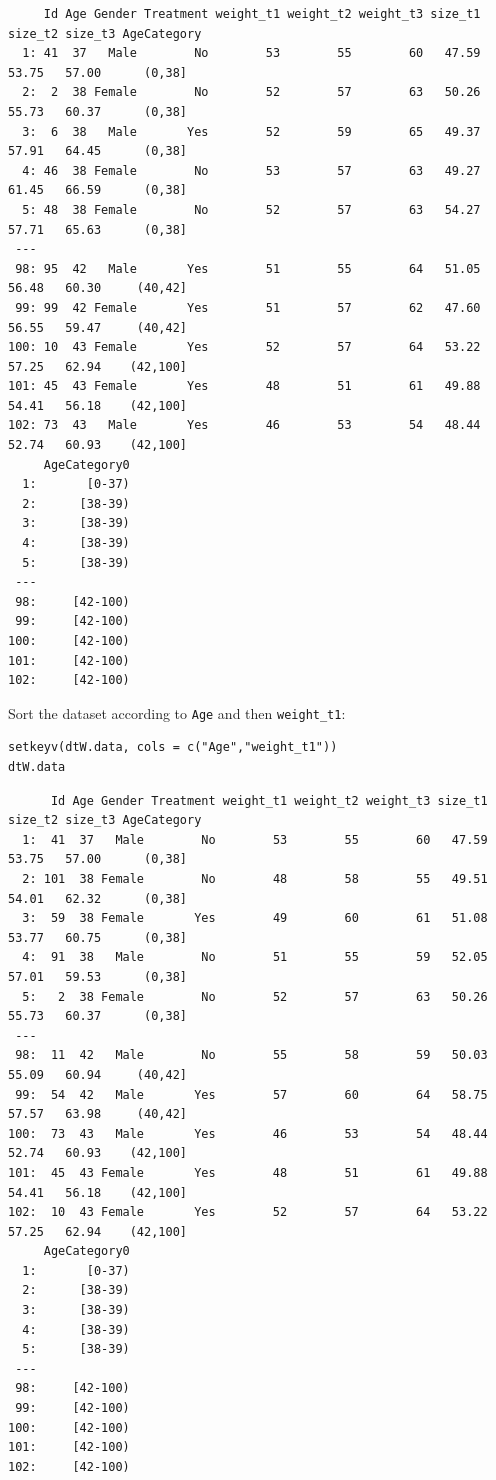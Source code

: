\documentclass{article}
\begin{document}
\begin{verbatim}
     Id Age Gender Treatment weight_t1 weight_t2 weight_t3 size_t1 size_t2 size_t3 AgeCategory
  1: 41  37   Male        No        53        55        60   47.59   53.75   57.00      (0,38]
  2:  2  38 Female        No        52        57        63   50.26   55.73   60.37      (0,38]
  3:  6  38   Male       Yes        52        59        65   49.37   57.91   64.45      (0,38]
  4: 46  38 Female        No        53        57        63   49.27   61.45   66.59      (0,38]
  5: 48  38 Female        No        52        57        63   54.27   57.71   65.63      (0,38]
 ---                                                                                          
 98: 95  42   Male       Yes        51        55        64   51.05   56.48   60.30     (40,42]
 99: 99  42 Female       Yes        51        57        62   47.60   56.55   59.47     (40,42]
100: 10  43 Female       Yes        52        57        64   53.22   57.25   62.94    (42,100]
101: 45  43 Female       Yes        48        51        61   49.88   54.41   56.18    (42,100]
102: 73  43   Male       Yes        46        53        54   48.44   52.74   60.93    (42,100]
     AgeCategory0
  1:       [0-37)
  2:      [38-39)
  3:      [38-39)
  4:      [38-39)
  5:      [38-39)
 ---             
 98:     [42-100)
 99:     [42-100)
100:     [42-100)
101:     [42-100)
102:     [42-100)
\end{verbatim}

Sort the dataset according to \texttt{Age} and then \texttt{weight\_t1}:
\lstset{language=r,label= ,caption= ,captionpos=b,numbers=none}
\begin{lstlisting}
setkeyv(dtW.data, cols = c("Age","weight_t1"))
dtW.data
\end{lstlisting}

\begin{verbatim}
      Id Age Gender Treatment weight_t1 weight_t2 weight_t3 size_t1 size_t2 size_t3 AgeCategory
  1:  41  37   Male        No        53        55        60   47.59   53.75   57.00      (0,38]
  2: 101  38 Female        No        48        58        55   49.51   54.01   62.32      (0,38]
  3:  59  38 Female       Yes        49        60        61   51.08   53.77   60.75      (0,38]
  4:  91  38   Male        No        51        55        59   52.05   57.01   59.53      (0,38]
  5:   2  38 Female        No        52        57        63   50.26   55.73   60.37      (0,38]
 ---                                                                                           
 98:  11  42   Male        No        55        58        59   50.03   55.09   60.94     (40,42]
 99:  54  42   Male       Yes        57        60        64   58.75   57.57   63.98     (40,42]
100:  73  43   Male       Yes        46        53        54   48.44   52.74   60.93    (42,100]
101:  45  43 Female       Yes        48        51        61   49.88   54.41   56.18    (42,100]
102:  10  43 Female       Yes        52        57        64   53.22   57.25   62.94    (42,100]
     AgeCategory0
  1:       [0-37)
  2:      [38-39)
  3:      [38-39)
  4:      [38-39)
  5:      [38-39)
 ---             
 98:     [42-100)
 99:     [42-100)
100:     [42-100)
101:     [42-100)
102:     [42-100)
\end{verbatim}
\end{document}

